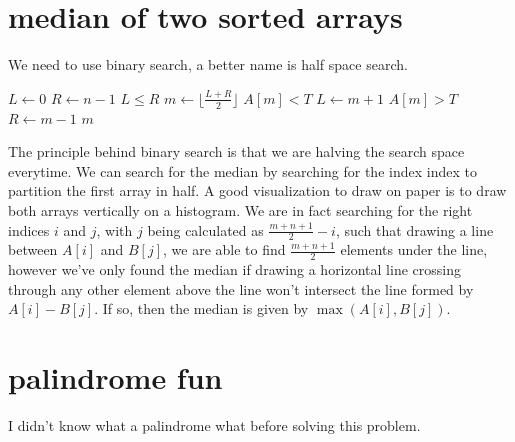 \documentclass[12pt]{article}
\begin{document}
\section{median of two sorted arrays}
We need to use binary search, a better name is half space search. 
\begin{codebox}
	\li $L \gets 0$
	\li $R \gets n-1$
	\li \While $L \leq R$ 
	\li 	\Do $m \gets \lfloor \frac{L+R}{2} \rfloor$
	\li	\If $A[m] < T$
	\li	\Then $L \gets m + 1$
	\li 	\ElseIf $A[m] > T$ 
	\li 	\Then $R \gets m - 1$
	\li 	\ElseNoIf \Return $m$
		\End
	\End


	\end{codebox}
	The principle behind binary search is that we are halving the search space everytime. We can search for the median by searching for the index index to partition the first array in half. A good visualization to draw on paper is to draw both arrays vertically on a histogram. We are in fact searching for the right indices $i$ and $j$, with $j$ being calculated as $\frac{m+n+1}{2} - i$, such that drawing a line between $A[i]$ and $B[j]$, we are able to find $\frac{m+n+1}{2}$ elements under the line, however we've only found the median if drawing a horizontal line crossing through any other element above the line won't intersect the line formed by $A[i]-B[j]$. If so, then the median is given by $\max(A[i],B[j])$.
	\section{palindrome fun}
	I didn't know what a palindrome what before solving this problem. 
\end{document}
